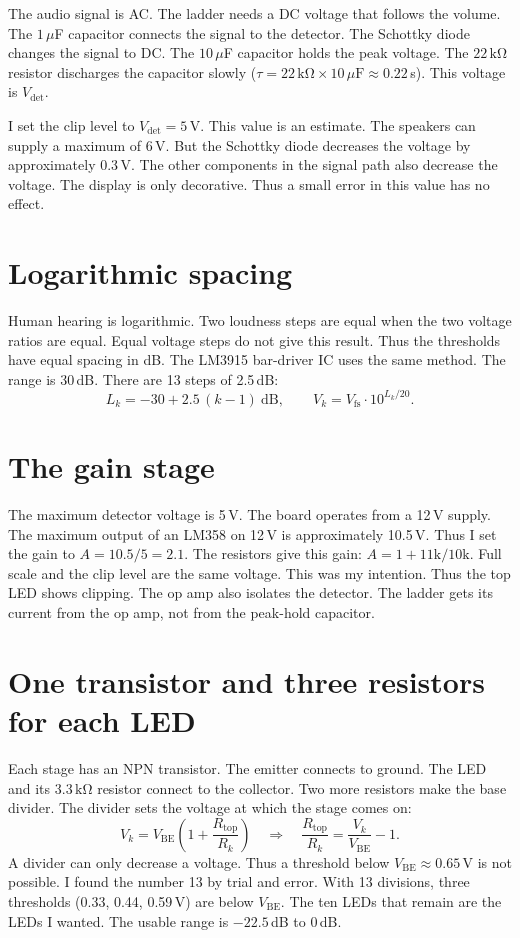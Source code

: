 \documentclass[11pt]{article}
\newcommand{\Vdet}{V_{\mathrm{det}}}
\newcommand{\Vbe}{V_{\mathrm{BE}}}
\newcommand{\Rtop}{R_{\mathrm{top}}}
\newcommand{\kO}{\,\mathrm{k\Omega}}
\begin{document}
The audio signal is AC. The ladder needs a DC voltage that follows the
volume. The $1\,\mu$F capacitor connects the signal to the detector. The
Schottky diode changes the signal to DC. The $10\,\mu$F capacitor holds the
peak voltage. The $22\kO$ resistor discharges the capacitor slowly
($\tau = 22\kO \times 10\,\mu\mathrm{F} \approx 0.22$\,s). This voltage is
$\Vdet$.

I set the clip level to $\Vdet = 5$\,V. This value is an estimate. The
speakers can supply a maximum of 6\,V. But the Schottky diode decreases the
voltage by approximately 0.3\,V. The other components in the signal path
also decrease the voltage. The display is only decorative. Thus a small
error in this value has no effect.

\section*{Logarithmic spacing}

Human hearing is logarithmic. Two loudness steps are equal when the two
voltage ratios are equal. Equal voltage steps do not give this result. Thus
the thresholds have equal spacing in dB. The LM3915 bar-driver IC uses the
same method. The range is 30\,dB. There are 13 steps of 2.5\,dB:
\begin{equation}
L_k = -30 + 2.5\,(k-1)\ \mathrm{dB}, \qquad
V_k = V_{\mathrm{fs}} \cdot 10^{L_k/20}.
\end{equation}

\section*{The gain stage}

The maximum detector voltage is 5\,V. The board operates from a 12\,V
supply. The maximum output of an LM358 on 12\,V is approximately 10.5\,V.
Thus I set the gain to $A = 10.5/5 = 2.1$. The resistors give this gain:
$A = 1 + 11\mathrm{k}/10\mathrm{k}$. Full scale and the clip level are the
same voltage. This was my intention. Thus the top LED shows clipping. The op
amp also isolates the detector. The ladder gets its current from the op amp,
not from the peak-hold capacitor.

\section*{One transistor and three resistors for each LED}

Each stage has an NPN transistor. The emitter connects to ground. The LED
and its $3.3\kO$ resistor connect to the collector. Two more resistors make
the base divider. The divider sets the voltage at which the stage comes on:
\begin{equation}
V_k = \Vbe\left(1 + \frac{\Rtop}{R_k}\right)
\quad\Longrightarrow\quad
\frac{\Rtop}{R_k} = \frac{V_k}{\Vbe} - 1.
\label{eq:rk}
\end{equation}
A divider can only decrease a voltage. Thus a threshold below
$\Vbe \approx 0.65$\,V is not possible. I found the number 13 by trial and
error. With 13 divisions, three thresholds (0.33, 0.44, 0.59\,V) are below
$\Vbe$. The ten LEDs that remain are the LEDs I wanted. The usable range is
$-22.5$\,dB to 0\,dB.
\end{document}
